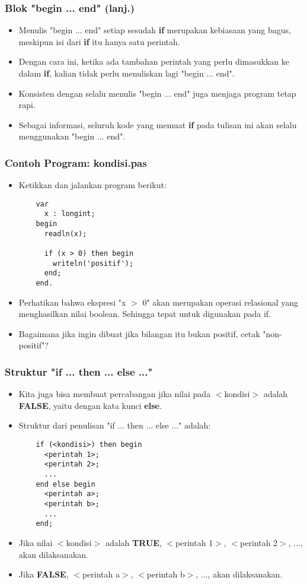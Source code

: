 \begin{frame}[fragile]
\frametitle{Blok "begin ... end" (lanj.)}
\begin{itemize}
  \item Menulis "begin ... end" setiap sesudah \textbf{if} merupakan kebiasaan yang bagus, meskipun isi dari \textbf{if} itu hanya satu perintah.
  \item Dengan cara ini, ketika ada tambahan perintah yang perlu dimasukkan ke dalam \textbf{if}, kalian tidak perlu menuliskan lagi "begin ... end".
  \item Konsisten dengan selalu menulis "begin ... end" juga menjaga program tetap rapi.
  \item Sebagai informasi, seluruh kode yang memuat \textbf{if} pada tulisan ini akan selalu menggunakan "begin ... end".
\end{itemize}
\end{frame}

\begin{frame}[fragile]
\frametitle{Contoh Program: kondisi.pas}
\begin{itemize}
  \item Ketikkan dan jalankan program berikut:
  \begin{lstlisting}
    var
      x : longint;
    begin
      readln(x);

      if (x > 0) then begin
        writeln('positif');
      end;
    end.
  \end{lstlisting}
  \item Perhatikan bahwa ekspresi "x $>$ 0" akan merupakan operasi relasional yang menghasilkan nilai boolean. Sehingga tepat untuk digunakan pada if.
  \item Bagaimana jika ingin dibuat jika bilangan itu bukan positif, cetak "non-positif"?
\end{itemize}
\end{frame}

\begin{frame}[fragile]
\frametitle{Struktur "if ... then ... else ..."}
\begin{itemize}
  \item Kita juga bisa membuat percabangan jika nilai pada $<$kondisi$>$ adalah \textbf{FALSE}, yaitu dengan kata kunci \textbf{else}.
  \item Struktur dari penulisan "if ... then ... else ..." adalah:
  \begin{lstlisting}
    if (<kondisi>) then begin
      <perintah 1>;
      <perintah 2>;
      ...
    end else begin
      <perintah a>;
      <perintah b>;
      ...
    end;
  \end{lstlisting}

  \item Jika nilai $<$kondisi$>$ adalah \textbf{TRUE}, $<$perintah 1$>$, $<$perintah 2$>$, ..., akan dilaksanakan.
  \item Jika \textbf{FALSE}, $<$perintah a$>$, $<$perintah b$>$, ..., akan dilaksanakan.
\end{itemize}
\end{frame}

